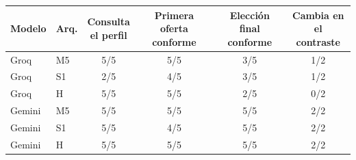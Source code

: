 \begin{tabular}{llcccc}\toprule
Modelo & Arq. & \shortstack{Consulta\\el perfil} & \shortstack{Primera oferta\\conforme} & \shortstack{Elección final\\conforme} & \shortstack{Cambia en\\el contraste} \\ \midrule
Groq & M5 & 5/5 & 5/5 & 3/5 & 1/2 \\
Groq & S1 & 2/5 & 4/5 & 3/5 & 1/2 \\
Groq & H & 5/5 & 5/5 & 2/5 & 0/2 \\
Gemini & M5 & 5/5 & 5/5 & 5/5 & 2/2 \\
Gemini & S1 & 5/5 & 4/5 & 5/5 & 2/2 \\
Gemini & H & 5/5 & 5/5 & 5/5 & 2/2 \\
\bottomrule\end{tabular}
